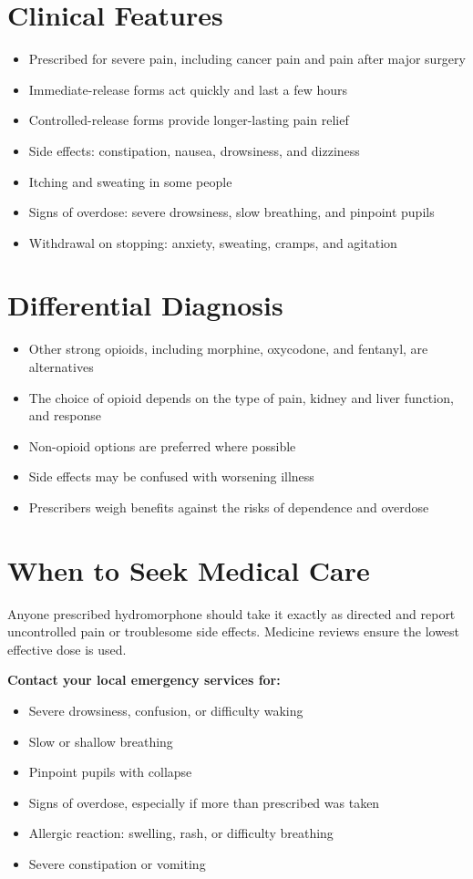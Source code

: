 \section*{Clinical Features}
\begin{itemize}
    \item Prescribed for severe pain, including cancer pain and pain after major surgery
    \item Immediate-release forms act quickly and last a few hours
    \item Controlled-release forms provide longer-lasting pain relief
    \item Side effects: constipation, nausea, drowsiness, and dizziness
    \item Itching and sweating in some people
    \item Signs of overdose: severe drowsiness, slow breathing, and pinpoint pupils
    \item Withdrawal on stopping: anxiety, sweating, cramps, and agitation
\end{itemize}

\section*{Differential Diagnosis}
\begin{itemize}
    \item Other strong opioids, including morphine, oxycodone, and fentanyl, are alternatives
    \item The choice of opioid depends on the type of pain, kidney and liver function, and response
    \item Non-opioid options are preferred where possible
    \item Side effects may be confused with worsening illness
    \item Prescribers weigh benefits against the risks of dependence and overdose
\end{itemize}

\section*{When to Seek Medical Care}
Anyone prescribed hydromorphone should take it exactly as directed and report uncontrolled pain or troublesome side effects. Medicine reviews ensure the lowest effective dose is used.

\textbf{Contact your local emergency services for:}
\begin{itemize}
    \item Severe drowsiness, confusion, or difficulty waking
    \item Slow or shallow breathing
    \item Pinpoint pupils with collapse
    \item Signs of overdose, especially if more than prescribed was taken
    \item Allergic reaction: swelling, rash, or difficulty breathing
    \item Severe constipation or vomiting
\end{itemize}

